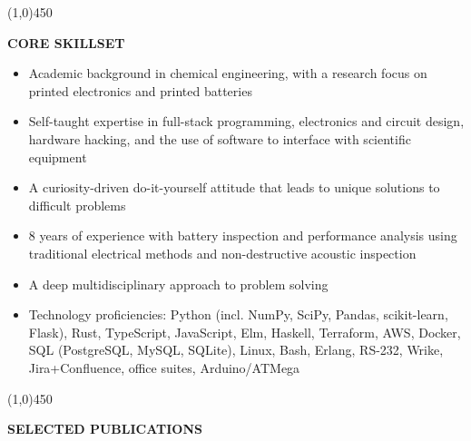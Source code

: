 \documentclass[9pt,letterpaper]{article}
\begin{document}
\begin{center}
  \line(1,0){450}
\end{center}

{\singlespacing
\noindent \textbf{CORE SKILLSET}

{\small\begin{itemize}
\item Academic background in chemical engineering, with a research focus on printed electronics and printed batteries
\item Self-taught expertise in full-stack programming, electronics and circuit design, hardware hacking, and the use of software to interface with scientific equipment
\item A curiosity-driven do-it-yourself attitude that leads to unique solutions to difficult problems
\item 8 years of experience with battery inspection and performance analysis using traditional electrical methods and non-destructive acoustic inspection
\item A deep multidisciplinary approach to problem solving
\item Technology proficiencies: Python (incl. NumPy, SciPy, Pandas, scikit-learn, Flask), Rust, TypeScript, JavaScript, Elm, Haskell, Terraform, AWS, Docker, SQL (PostgreSQL, MySQL, SQLite), Linux, Bash, Erlang, RS-232, Wrike, Jira+Confluence, office suites, Arduino/ATMega
\end{itemize}}}


\begin{center}
  \line(1,0){450}
\end{center}



\singlespacing


\onehalfspacing

\noindent \textbf{SELECTED PUBLICATIONS}
\begin{bibunit}[unsrt]
  \small
  \nocite{*}
  \putbib[citations]
\end{bibunit}


\end{document}
